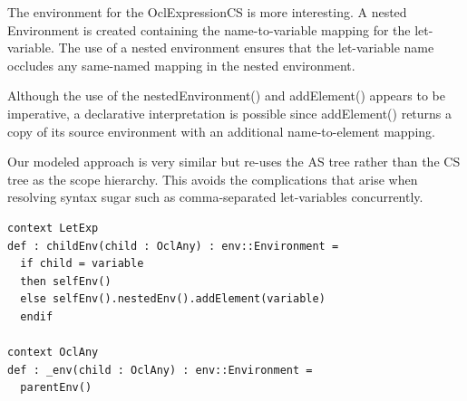 \documentclass{llncs}
\begin{document}
The environment for the OclExpressionCS is more interesting. A nested Environment is created containing the name-to-variable mapping for the let-variable. The use of a nested environment ensures that the let-variable name occludes any same-named mapping in the nested environment.

Although the use of the nestedEnvironment() and addElement() appears to be imperative, a declarative interpretation is possible since addElement() returns a copy of its source environment with an additional name-to-element mapping.

Our modeled approach is very similar but re-uses the AS tree rather than the CS tree as the scope hierarchy. This avoids the complications that arise when resolving syntax sugar such as comma-separated let-variables concurrently.




\begin{lstlisting}[caption=Name resolution producers, label=lst:exampleNameResodesc, language=OCL]
context LetExp
def : childEnv(child : OclAny) : env::Environment =
  if child = variable
  then selfEnv()
  else selfEnv().nestedEnv().addElement(variable)
  endif
  
context OclAny
def : _env(child : OclAny) : env::Environment =
  parentEnv()	
\end{lstlisting}
\end{document}
